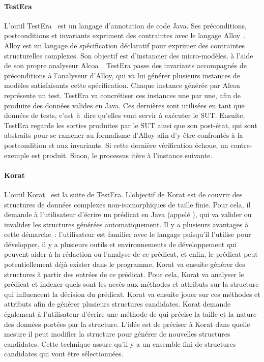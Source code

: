 \paragraph{TestEra} L'outil TestEra~ est un langage
d'annotation de code Java. Ses préconditions, postconditions et invariants
expriment des contraintes avec le langage Alloy~. Alloy est un
langage de spécification déclaratif pour exprimer des contraintes structurelles
complexes. Son objectif est d'instancier des micro-modèles, à l'aide de son
propre analyseur Alcoa~. TestEra passe des invariants
accompagnés de préconditions à l'analyseur d'Alloy, qui va lui générer plusieurs
instances de modèles satisfaisants cette spécification. Chaque instance générée
par Alcoa représente un test. TestEra va concrétiser ces instances une par une,
afin de produire des données valides en Java. Ces dernières sont utilisées en
tant que données de tests, c'est~à~dire qu'elles vont servir à exécuter le SUT.
Ensuite, TestEra regarde les sorties produites par le SUT ainsi que son
post-état, qui sont abstraits pour se ramener au formalisme d'Alloy afin d'y
être confrontés à la postcondition et aux invariants. Si cette dernière
vérification échoue, un contre-exemple est produit. Sinon, le processus itère à
l'instance suivante.

\paragraph{Korat} L'outil Korat~ est la suite de TestEra.
L'objectif de Korat est de couvrir des structures de données
complexes non-isomorphiques de taille finie. Pour cela, il demande à
l'utilisateur d'écrire un prédicat en Java (appelé ), qui va valider
ou invalider les structures générées automatiquement. Il y a plusieurs avantages
à cette démarche~: l'utilisateur est familier avec le langage puisqu'il
l'utilise pour développer, il y a plusieurs outils et environnements de
développement qui peuvent aider à la rédaction ou l'analyse de ce prédicat, et
enfin, le prédicat peut potentiellement déjà exister dans le programme. Korat va
ensuite générer des structures à partir des entrées de ce prédicat. Pour cela,
Korat va analyser le prédicat et indexer quels sont les accès aux méthodes et
attributs sur la structure qui influencent la décision du prédicat. Korat va
ensuite jouer sur ces méthodes et attributs afin de générer plusieurs structures
candidates. Korat demande également à l'utilisateur d'écrire une méthode de
 qui précise la taille et la nature des données portées
par la structure. L'idée est de préciser à Korat dans quelle mesure il peut
modifier la structure pour générer de nouvelles structures candidates. Cette
technique assure qu'il y a un ensemble fini de structures candidates qui vont
être sélectionnées.

